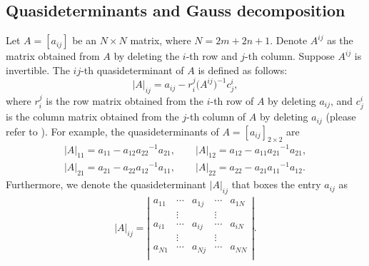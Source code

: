 \documentclass[10pt,a4paper]{amsart}
\numberwithin{equation}{section}
\begin{document}
\subsection{Quasideterminants and Gauss decomposition }\label{sec4.3}
Let $A=[a_{ij}]$ be an $N\times N$ matrix, where $N=2m+2n+1$. Denote $A^{ij}$ as the matrix obtained from $A$ by deleting the $i$-th row and $j$-th column. Suppose $A^{ij}$ is invertible. The $ij$-th quasideterminant of $A$ is defined as follows:
\begin{equation*}
 |A|_{ij}=a_{ij}-r^j_i\bigl(A^{ij}\bigr)^{-1}c^i_j,
\end{equation*}
where $r^j_i$ is the row matrix obtained from the $i$-th row of $A$ by deleting $a_{ij}$, and $c^i_j$ is the column matrix obtained from the $j$-th column of $A$ by deleting $a_{ij}$ (please refer to \cite{IMG,DKBM}). For example, the quasideterminants of $A=[a_{ij}]_{2\times2}$ are
\begin{gather*}
 |A|_{11}= a_{11}-a_{12}{a_{22}}^{-1}a_{21}, \qquad |A|_{12}= a_{12}-a_{11}{a_{21}}^{-1}a_{21},\\
 |A|_{21}= a_{21}-a_{22}{a_{12}}^{-1}a_{11}, \qquad |A|_{22}= a_{22}-a_{21}{a_{11}}^{-1}a_{12}.
\end{gather*}
Furthermore, we denote the quasideterminant $|A|_{ij}$ that boxes the entry $a_{ij}$ as
\begin{align*}
|A|_{ij}=
\left|
 \begin{matrix}
 a_{11} & \cdots & a_{1j} & \cdots & a_{1N} \\
 & \vdots & & \vdots & \\
 a_{i1} & \cdots & \boxed{a_{ij}} & \cdots & a_{iN} \\
 & \vdots & & \vdots & \\
 a_{N1} & \cdots & a_{Nj} & \cdots & a_{NN} \\
 \end{matrix}
\right|.
\end{align*}
\end{document}
